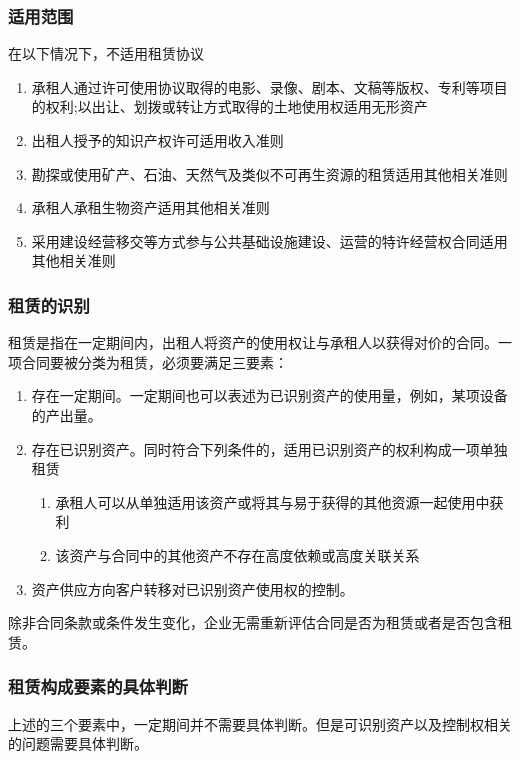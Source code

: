 \documentclass[UTF8,12pt]{ctexart}
\numberwithin{equation}{section} %
\numberwithin{figure}{section}
\numberwithin{table}{section}
\begin{document}
	\subsubsection{适用范围}
	在以下情况下，不适用租赁协议
	\begin{enumerate}
		\item 承租人通过许可使用协议取得的电影、录像、剧本、文稿等版权、专利等项目的权利;以出让、划拨或转让方式取得的土地使用权适用无形资产
		
		\item 出租人授予的知识产权许可适用收入准则
		
		\item 勘探或使用矿产、石油、天然气及类似不可再生资源的租赁适用其他相关准则
		
		\item 承租人承租生物资产适用其他相关准则
		
		\item 采用建设经营移交等方式参与公共基础设施建设、运营的特许经营权合同适用其他相关准则
	\end{enumerate}
	
	\subsubsection{租赁的识别}
	租赁是指在一定期间内，出租人将资产的使用权让与承租人以获得对价的合同。一项合同要被分类为租赁，必须要满足三要素：
	\begin{enumerate}
		\item 存在一定期间。一定期间也可以表述为已识别资产的使用量，例如，某项设备的产出量。
		
		\item 存在已识别资产。同时符合下列条件的，适用已识别资产的权利构成一项单独租赁
		\begin{enumerate}
			\item 承租人可以从单独适用该资产或将其与易于获得的其他资源一起使用中获利
			
			\item 该资产与合同中的其他资产不存在高度依赖或高度关联关系
		\end{enumerate}
		
		\item 资产供应方向客户转移对已识别资产使用权的控制。
	\end{enumerate}
	
	除非合同条款或条件发生变化，企业无需重新评估合同是否为租赁或者是否包含租赁。

	\subsubsection{租赁构成要素的具体判断}
	上述的三个要素中，一定期间并不需要具体判断。但是可识别资产以及控制权相关的问题需要具体判断。
	
\end{document}
